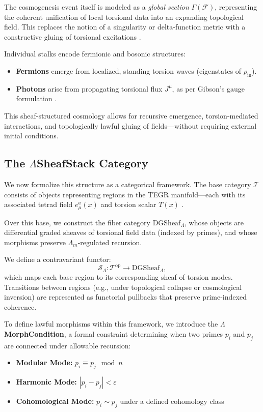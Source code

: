 \documentclass{article}
\theoremstyle{plain}
\begin{document}
The cosmogenesis event itself is modeled as a \emph{global section} $\Gamma(\mathcal{F})$, representing the coherent unification of local torsional data into an expanding topological field. This replaces the notion of a singularity or delta-function metric with a constructive gluing of torsional excitations \cite{sorensen2025genesis}.

Individual stalks encode fermionic and bosonic structures:
\begin{itemize}
    \item \textbf{Fermions} emerge from localized, standing torsion waves (eigenstates of $\rho_{\text{in}}$).
    \item \textbf{Photons} arise from propagating torsional flux $J^\mu$, as per Gibson’s gauge formulation \cite{gibson2025torsionEnergy}.
\end{itemize}

This sheaf-structured cosmology allows for recursive emergence, torsion-mediated interactions, and topologically lawful gluing of fields—without requiring external initial conditions.

\subsection{The $\Lambda$SheafStack Category}

We now formalize this structure as a categorical framework. The base category $\mathcal{T}$ consists of objects representing regions in the TEGR manifold—each with its associated tetrad field $e^a_\mu(x)$ and torsion scalar $T(x)$ \cite{gibson2025overview}.

Over this base, we construct the fiber category $\text{DGSheaf}_\Lambda$, whose objects are differential graded sheaves of torsional field data (indexed by primes), and whose morphisms preserve $\Lambda_m$-regulated recursion.

We define a contravariant functor:
\[
\mathcal{S}_\Lambda: \mathcal{T}^{\text{op}} \to \text{DGSheaf}_\Lambda,
\]
which maps each base region to its corresponding sheaf of torsion modes. Transitions between regions (e.g., under topological collapse or cosmological inversion) are represented as functorial pullbacks that preserve prime-indexed coherence.

To define lawful morphisms within this framework, we introduce the \textbf{$\Lambda$MorphCondition}, a formal constraint determining when two primes $p_i$ and $p_j$ are connected under allowable recursion:
\begin{itemize}
    \item \textbf{Modular Mode:} $p_i \equiv p_j \mod n$
    \item \textbf{Harmonic Mode:} $|p_i - p_j| < \varepsilon$
    \item \textbf{Cohomological Mode:} $p_i \sim p_j$ under a defined cohomology class
\end{itemize}
\end{document}
